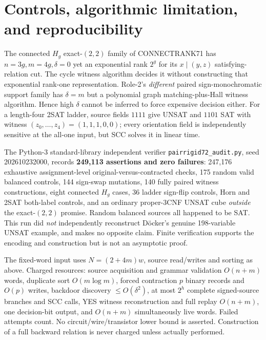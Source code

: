 \documentclass[11pt]{article}
\begin{document}
\section{Controls, algorithmic limitation, and reproducibility}
The connected $H_g$ exact-$(2,2)$ family of CONNECTRANK71 has $n=3g,m=4g,\delta=0$ yet an exponential rank $2^g$ for its $x\mid(y,z)$ satisfying-relation cut. The cycle witness algorithm decides it without constructing that exponential rank-one representation. Role-2's \emph{different} paired sign-monochromatic support family has $\delta=m$ but a polynomial graph matching-plus-Hall witness algorithm. Hence high $\delta$ cannot be inferred to force expensive decision either. For a length-four 2SAT ladder, source fields $1111$ give UNSAT and $1101$ SAT with witness $(z_0,\ldots,z_4)=(1,1,1,0,0)$; every orientation field is independently sensitive at the all-one input, but SCC solves it in linear time.
\par\noindent The Python-3 standard-library independent verifier \texttt{pairrigid72\_audit.py}, seed 202610232000, records \textbf{249,113 assertions and zero failures}: 247,176 exhaustive assignment-level original-versus-contracted checks, 175 random valid balanced controls, 144 sign-swap mutations, 140 fully paired witness constructions, eight connected $H_g$ cases, 36 ladder sign-flip controls, Horn and 2SAT both-label controls, and an ordinary proper-3CNF UNSAT cube \emph{outside} the exact-$(2,2)$ promise. Random balanced sources all happened to be SAT. This run did \emph{not} independently reconstruct D\"ocker's genuine 198-variable UNSAT example, and makes no opposite claim. Finite verification supports the encoding and construction but is not an asymptotic proof.
\par\noindent The fixed-word input uses $N=(2+4m)w$, source read/writes and sorting as above. Charged resources: source acquisition and grammar validation $O(n+m)$ words, duplicate sort $O(m\log m)$, forced contraction $p$ binary records and $O(p)$ writes, backdoor discovery $\le O(\delta^2)$, at most $2^h$ complete signed-source branches and SCC calls, YES witness reconstruction and full replay $O(n+m)$, one decision-bit output, and $O(n+m)$ simultaneously live words. Failed attempts count. No circuit/wire/transistor lower bound is asserted. Construction of a full backward relation is never charged unless actually performed.
\end{document}
